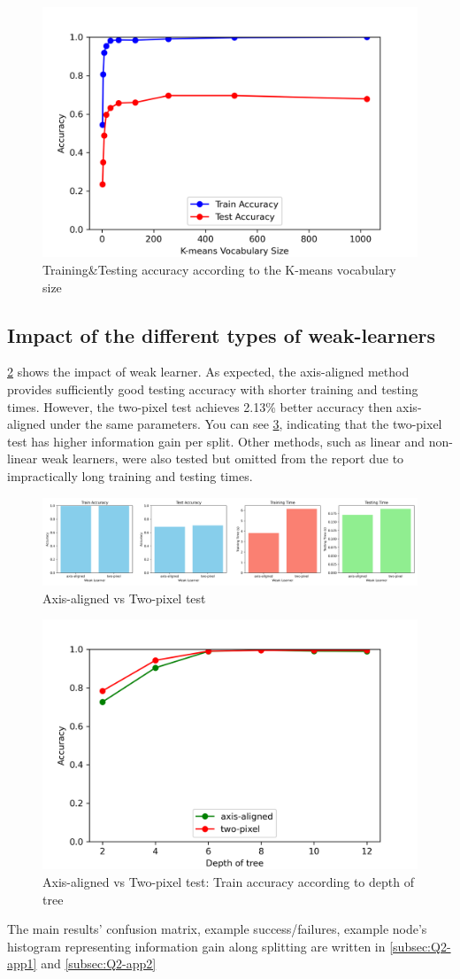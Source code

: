 \begin{figure}
	\centering
	\includegraphics[width=0.4\linewidth]{image/q2-fig5.png}
	\caption{Training\&Testing accuracy according to the K-means vocabulary size}
	\label{fig:q2-fig5}
\end{figure}

\subsection{Impact of the different types of weak-learners}
\cref{fig:q2-fig6} shows the impact of weak learner. As expected, the axis-aligned method provides sufficiently good testing accuracy with shorter training and testing times. However, the two-pixel test achieves 2.13\% better accuracy then axis-aligned under the same parameters. You can see \cref{fig:q2-fig7}, indicating that the two-pixel test has higher information gain per split. Other methods, such as linear and non-linear weak learners, were also tested but omitted from the report due to impractically long training and testing times.

\begin{figure}
	\centering
	\includegraphics[width=0.8\linewidth]{image/q2-fig6.png}
	\caption{Axis-aligned vs Two-pixel test}
	\label{fig:q2-fig6}
\end{figure}

\begin{figure}
	\centering
	\includegraphics[width=0.4\linewidth]{image/q2-fig7-1.png}
	\caption{Axis-aligned vs Two-pixel test: Train accuracy according to depth of tree}
	\label{fig:q2-fig7}
\end{figure}

The main results' confusion matrix, example success/failures, example node's histogram representing information gain along splitting are written in \cref{subsec:Q2-app1} and \cref{subsec:Q2-app2}